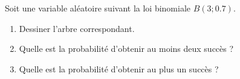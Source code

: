 
\begin{exercice}\label{exoPremiere-0075}

    Soit une variable aléatoire suivant la loi binomiale \( B(3;0.7)\). 
    \begin{enumerate}
        \item
            Dessiner l'arbre correspondant.
        \item
            Quelle est la probabilité d'obtenir au moins deux succès ?
        \item
            Quelle est la probabilité d'obtenir au plus un succès ?
    \end{enumerate}

\end{exercice}
